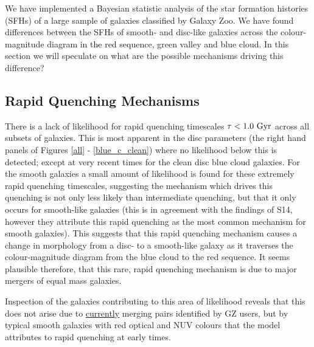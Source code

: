 \documentclass[useAMS,usenatbib]{mn2e}
\begin{document}
We have implemented a Bayesian statistic analysis of the star formation histories (SFHs) of a large sample of galaxies classified by Galaxy Zoo. We have found differences between the SFHs of smooth- and disc-like galaxies across the colour-magnitude diagram in the red sequence, green valley and blue cloud. In this section we will speculate on what are the possible mechanisms driving this difference? 

\subsection{Rapid Quenching Mechanisms}

There is a lack of likelihood for rapid quenching timescales $\tau < 1.0~\rm{Gyr}$ across all subsets of galaxies. This is most apparent in the disc parameters (the right hand panels of Figures \ref{all} - \ref{blue_c_clean}) where no likelihood below this is detected; except at very recent times for the clean disc blue cloud galaxies. For the smooth galaxies a small amount of likelihood is found for these extremely rapid quenching timescales, suggesting the mechanism which drives this quenching is not only less likely than intermediate quenching, but that it only occurs for smooth-like galaxies (this is in agreement with the findings of S14, however they attribute this rapid quenching as the most common mechanism for smooth galaxies). This suggests that this rapid quenching mechanism causes a change in morphology from a disc- to a smooth-like galaxy as it traverses the colour-magnitude diagram from the blue cloud to the red sequence. It seems plausible therefore, that this rare, rapid quenching mechanism is due to major mergers of equal mass galaxies.


Inspection of the galaxies contributing to this area of likelihood reveals that this does not arise due to \underline{currently} merging pairs identified by GZ users, but by typical smooth galaxies with red optical and NUV colours that the model attributes to rapid quenching at early times.
\end{document}
